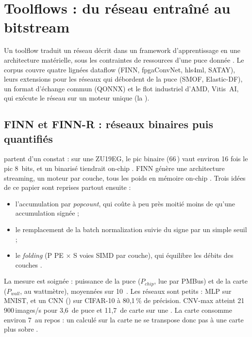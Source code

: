 \section{Toolflows : du réseau entraîné au bitstream}
\label{sec:toolflows}

Un toolflow traduit un réseau décrit dans un framework d'apprentissage en une architecture
matérielle, sous les contraintes de ressources d'une puce donnée
\citep[§1]{2018-venieris-toolflows-mapping-convolutional-neural-networks}. Le corpus couvre
quatre lignées dataflow (FINN, fpgaConvNet, hls4ml, SATAY), leurs extensions pour les
réseaux qui débordent de la puce (SMOF, Elastic-DF), un format d'échange commun (QONNX) et le
flot industriel d'AMD, Vitis~AI, qui exécute le réseau sur un moteur unique (la ).

\subsection{FINN et FINN-R : réseaux binaires puis quantifiés}

\citet{arxiv-1612.07119-finn-framework-fast-scalable-binarized} partent d'un constat : sur
une  ZU19EG, le pic binaire (66\,) vaut environ 16 fois le pic 8~bits,
et un  binarisé tiendrait on-chip . FINN génère une architecture
streaming, un moteur par couche, tous les poids en mémoire on-chip . Trois idées
de ce papier sont reprises partout ensuite :
\begin{itemize}
  \item l'accumulation par \emph{popcount}, qui coûte à peu près moitié moins de 
    qu'une accumulation signée  ;
  \item le remplacement de la batch normalization suivie du signe par un simple seuil
     ;
  \item le \emph{folding} (P PE $\times$ S voies SIMD par couche), qui équilibre les débits
    des couches .
\end{itemize}
La mesure est soignée : puissance de la puce ($P_{chip}$, lue par PMBus) et de la carte
($P_{wall}$, au wattmètre), moyennées sur 10\, . Les réseaux sont petits :
MLP sur MNIST, et un CNN () sur CIFAR-10 à 80,1\,\% de précision. CNV-max atteint
21\,900\,images/s pour 3,6\, de puce et 11,7\, de carte sur une 
. La carte consomme environ 7\, au repos  : un 
calculé sur la carte ne se transpose donc pas à une carte plus sobre \deduit.


